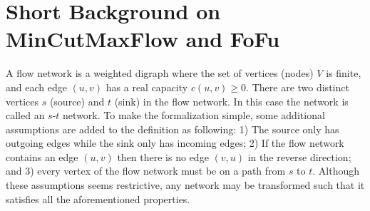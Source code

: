 \documentclass{llncs}
\begin{document}
\section{Short Background on MinCutMaxFlow and FoFu}
%       
%   
% 
%         
%   
%   
%   
%   
%   
A flow network is a weighted digraph where the set of vertices (nodes) $V$ is finite, and each edge $(u, v)$ has a real capacity $c (u, v) \geq 0$. There are two distinct vertices $s$ (source) and $t$ (sink) in the flow network. In this case the network is called an $s$-$t$ network. To make the formalization simple, some additional assumptions are added to the definition as following: 1) The source only has outgoing edges while the sink only has incoming edges; 2) If the flow network contains an edge $(u, v)$ then there is no edge $(v, u)$ in the reverse direction; and 3) every vertex of the flow network must be on a path from $s$ to $t$. Although these assumptions seems restrictive, any network may be transformed such that it satisfies all the aforementioned properties.
\end{document}
